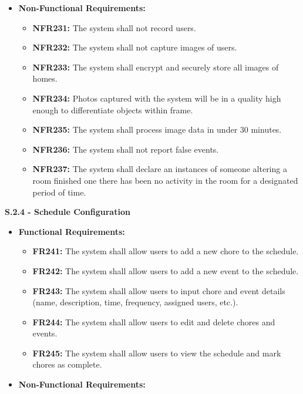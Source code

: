 \documentclass{scrreprt}
\theoremstyle{definition}
\begin{document}
\begin{flushleft}
\begin{itemize}
\begin{itemize}
        \end{itemize}
        \item \textbf{Non-Functional Requirements:}
        \begin{itemize}
            \item \textbf{NFR231:} The system shall not record users.
            \item \textbf{NFR232:} The system shall not capture images of users.
            \item \textbf{NFR233:} The system shall encrypt and securely store all images of homes.
            \item \textbf{NFR234:} Photos captured with the system will be in a quality high enough to differentiate objects within frame.
            \item \textbf{NFR235:} The system shall process image data in under 30 minutes.
            \item \textbf{NFR236:} The system shall not report false events.
            \item \textbf{NFR237:} The system shall declare an instances of someone altering a room finished one there has been no activity in the room for a designated period of time.
  		\end{itemize}
  	\end{itemize}
  	\item \textbf{S.2.4 - Schedule Configuration}
  	\begin{itemize}
  		\item \textbf{Functional Requirements:}
  		\begin{itemize}
  			\item \textbf{FR241:} The system shall allow users to add a new chore to the schedule.
            \item \textbf{FR242:} The system shall allow users to add a new event to the schedule.
            \item \textbf{FR243:} The system shall allow users to input chore and event details (name, description, time, frequency, assigned users, etc.).
            \item \textbf{FR244:} The system shall allow users to edit and delete chores and events.
            \item \textbf{FR245:} The system shall allow users to view the schedule and mark chores as complete.
  		\end{itemize}
  		\item \textbf{Non-Functional Requirements:}
  		\begin{itemize}

\end{itemize}
\end{itemize}
\end{flushleft}
\end{document}
